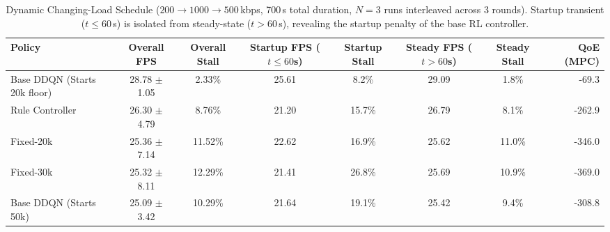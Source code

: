\begin{table}[t]
\centering
\caption{Dynamic Changing-Load Schedule ($200 \to 1000 \to 500$\,kbps, 700\,s total duration, $N=3$ runs interleaved across 3 rounds). Startup transient ($t \le 60$\,s) is isolated from steady-state ($t > 60$\,s), revealing the startup penalty of the base RL controller.}
\label{tab:dynamic_changing_load}
\small
\begin{tabular}{lccccccr}
\toprule
\textbf{Policy} & \textbf{Overall FPS} & \textbf{Overall Stall} & \textbf{Startup FPS ($t\le 60$s)} & \textbf{Startup Stall} & \textbf{Steady FPS ($t>60$s)} & \textbf{Steady Stall} & \textbf{QoE (MPC)} \\
\midrule
Base DDQN (Starts 20k floor) & 28.78 $\pm$ 1.05 & 2.33\% & 25.61 & 8.2\% & 29.09 & 1.8\% & -69.3 \\
Rule Controller & 26.30 $\pm$ 4.79 & 8.76\% & 21.20 & 15.7\% & 26.79 & 8.1\% & -262.9 \\
Fixed-20k & 25.36 $\pm$ 7.14 & 11.52\% & 22.62 & 16.9\% & 25.62 & 11.0\% & -346.0 \\
Fixed-30k & 25.32 $\pm$ 8.11 & 12.29\% & 21.41 & 26.8\% & 25.69 & 10.9\% & -369.0 \\
Base DDQN (Starts 50k) & 25.09 $\pm$ 3.42 & 10.29\% & 21.64 & 19.1\% & 25.42 & 9.4\% & -308.8 \\
\bottomrule
\end{tabular}
\end{table}